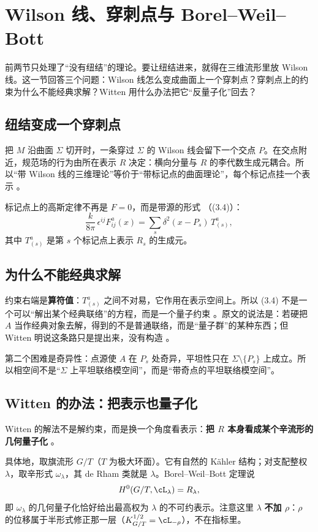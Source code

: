 \section{Wilson 线、穿刺点与 Borel--Weil--Bott}
\label{sec:wilson}

前两节只处理了“没有纽结”的理论。要让纽结进来，就得在三维流形里放 Wilson 线。这一节回答三个问题：Wilson 线怎么变成曲面上一个穿刺点？穿刺点上的约束为什么不能经典求解？Witten 用什么办法把它“反量子化”回去？

\subsection{纽结变成一个穿刺点}

把 $M$ 沿曲面 $\Sigma$ 切开时，一条穿过 $\Sigma$ 的 Wilson 线会留下一个交点 $P$。在交点附近，规范场的行为由所在表示 $R$ 决定：横向分量与 $R$ 的李代数生成元耦合。所以“带 Wilson 线的三维理论”等价于“带标记点的曲面理论”，每个标记点挂一个表示 。

标记点上的高斯定律不再是 $F=0$，而是带源的形式 （(3.4)）：
\begin{equation}
\frac{k}{8\pi}\,\epsilon^{ij}F^a_{ij}(x)=\sum_s \delta^2(x-P_s)\,T^a_{(s)} ,
\label{eq:markedgauss}
\end{equation}
其中 $T^a_{(s)}$ 是第 $s$ 个标记点上表示 $R_s$ 的生成元。

\subsection{为什么不能经典求解}

约束右端是\textbf{算符值}：$T^a_{(s)}$ 之间不对易，它作用在表示空间上。所以 (3.4) 不是一个可以“解出某个经典联络”的方程，而是一个量子约束 。原文的说法是：若硬把 $A$ 当作经典对象去解，得到的不是普通联络，而是“量子群”的某种东西；但 Witten 明说这条路只是提出来，没有构造 。

第二个困难是奇异性：点源使 $A$ 在 $P_s$ 处奇异，平坦性只在 $\Sigma\setminus\{P_s\}$ 上成立。所以相空间不是“$\Sigma$ 上平坦联络模空间”，而是“带奇点的平坦联络模空间”。

\subsection{Witten 的办法：把表示也量子化}

Witten 的解法不是解约束，而是换一个角度看表示：\textbf{把 $R$ 本身看成某个辛流形的几何量子化} 。

具体地，取旗流形 $G/T$（$T$ 为极大环面）。它有自然的 K\"ahler 结构；对支配整权 $\lambda$，取辛形式 $\omega_\lambda$，其 de Rham 类就是 $\lambda$。Borel--Weil--Bott 定理说
\begin{equation}
H^0(G/T,\cL_\lambda)=R_\lambda ,
\end{equation}
即 $\omega_\lambda$ 的几何量子化恰好给出最高权为 $\lambda$ 的不可约表示。注意这里 $\lambda$ \textbf{不加 $\rho$}：$\rho$ 的位移属于半形式修正那一层（$K_{G/T}^{1/2}=\cL_{-\rho}$），不在指标里。

